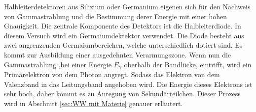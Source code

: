 Halbleiterdetektoren aus Silizium oder Germanium eigenen sich für den Nachweis von Gammastrahlung und die Bestimmung derer Energie mit einer hohen Gnauigkeit.
Die zentrale Komponente des Detektors ist die Halbleiterdiode. In diesem Versuch wird ein Germaiumdektektor verwendet.
Die Diode besteht aus zwei angrenzenden Germaiumbereichen, welche unterschiedlich dotiert sind. Es kommt zur Ausbildung einer 
ausgedehnten Verarmungszone. Wenn nun die Gammastrahlung ,bei einer Energie $E_{\gamma} $ oberhalb der Bandlücke, eintrifft, wird ein Primärelektron von dem Photon angregt. Sodass das Elektron
von dem Valenzband in das Leitungsband angehoben wird. Die Energie dieses Elektrons ist sehr hoch, daher kommt es zu Anregung von Sekundärteilchen.
Dieser Prozess wird in Abschnitt \ref{sec:WW mit Materie} genauer erläutert.
